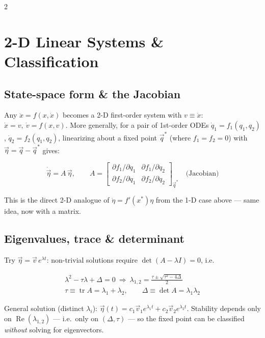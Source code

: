 \documentclass[10pt]{article}
\begin{document}
\begin{multicols}{2}
\section*{2-D Linear Systems \& Classification}
\subsection*{State-space form \& the Jacobian}
Any $\ddot x = f(x,\dot x)$ becomes a 2-D first-order system with $v\equiv\dot x$: $\dot x=v,\ \dot v=f(x,v)$. More generally, for a pair of 1st-order ODEs $\dot q_1=f_1(q_1,q_2)$, $\dot q_2=f_2(q_1,q_2)$, linearizing about a fixed point $\vec q^*$ (where $f_1=f_2=0$) with $\vec\eta=\vec q-\vec q^*$ gives:
\begin{keybox}
\[
    \dot{\vec\eta} = A\,\vec\eta, \qquad
    A = \begin{bmatrix}
        \partial f_1/\partial q_1 & \partial f_1/\partial q_2\\[2pt]
        \partial f_2/\partial q_1 & \partial f_2/\partial q_2
    \end{bmatrix}_{\vec q^*} \quad\text{(Jacobian)}
\]
\end{keybox}
This is the direct 2-D analogue of $\dot\eta=f'(x^*)\eta$ from the 1-D case above --- same idea, now with a matrix.

\subsection*{Eigenvalues, trace \& determinant}
Try $\vec\eta=\vec v\,e^{\lambda t}$: non-trivial solutions require $\det(A-\lambda I)=0$, i.e.
\begin{keybox}
\begin{gather*}
    \lambda^2-\tau\lambda+\Delta=0
    \ \Rightarrow\
    \lambda_{1,2}=\frac{\tau\pm\sqrt{\tau^2-4\Delta}}{2} \\
    \tau\equiv\operatorname{tr}A=\lambda_1+\lambda_2,\qquad
    \Delta\equiv\det A=\lambda_1\lambda_2
\end{gather*}
\end{keybox}
General solution (distinct $\lambda_i$): $\vec\eta(t)=c_1\vec v_1e^{\lambda_1t}+c_2\vec v_2e^{\lambda_2t}$. Stability depends only on $\operatorname{Re}(\lambda_{1,2})$ --- i.e.\ only on $(\Delta,\tau)$ --- so the fixed point can be classified \emph{without} solving for eigenvectors.


\end{multicols}
\end{document}
